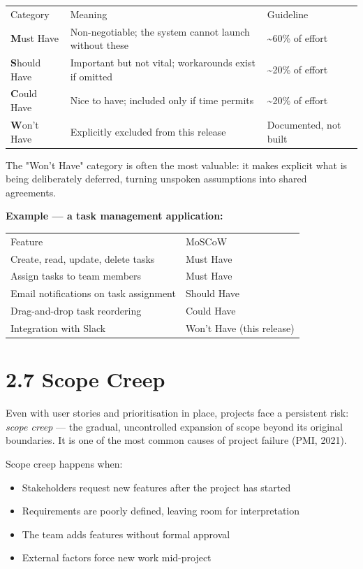 \documentclass[11pt,a4paper]{book}
\begin{document}
\begin{tabular}{lll}
\hline
Category & Meaning & Guideline \\
\textbf{M}ust Have & Non-negotiable; the system cannot launch without these & \textasciitilde{}60\% of effort \\
\textbf{S}hould Have & Important but not vital; workarounds exist if omitted & \textasciitilde{}20\% of effort \\
\textbf{C}ould Have & Nice to have; included only if time permits & \textasciitilde{}20\% of effort \\
\textbf{W}on't Have & Explicitly excluded from this release & Documented, not built \\
\hline
\end{tabular}

The "Won't Have" category is often the most valuable: it makes explicit what is being deliberately deferred, turning unspoken assumptions into shared agreements.

\textbf{Example --- a task management application:}

\begin{tabular}{ll}
\hline
Feature & MoSCoW \\
Create, read, update, delete tasks & Must Have \\
Assign tasks to team members & Must Have \\
Email notifications on task assignment & Should Have \\
Drag-and-drop task reordering & Could Have \\
Integration with Slack & Won't Have (this release) \\
\hline
\end{tabular}

\medskip

\section{2.7 Scope Creep}

Even with user stories and prioritisation in place, projects face a persistent risk: \textit{scope creep} --- the gradual, uncontrolled expansion of scope beyond its original boundaries. It is one of the most common causes of project failure (PMI, 2021).

Scope creep happens when:

\begin{itemize}
  \item Stakeholders request new features after the project has started
  \item Requirements are poorly defined, leaving room for interpretation
  \item The team adds features without formal approval
  \item External factors force new work mid-project
\end{itemize}
\end{document}
